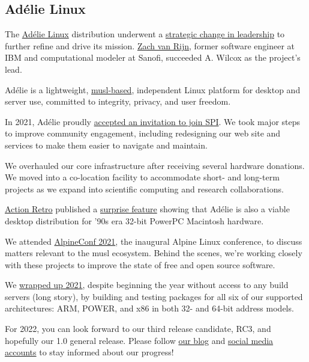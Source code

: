 \documentclass[a4paper]{report}
\begin{document}
\subsection{Adélie Linux}

The \href{https://www.adelielinux.org/}{Adélie Linux} distribution underwent a \href{https://blog.adelielinux.org/2021/07/22/2021-state-of-the-adelie-linux-distribution/}{strategic change in leadership} to further refine and drive its mission.  \href{https://zv.io/about/}{Zach van Rijn}, former software engineer at IBM and computational modeler at Sanofi, succeeded A. Wilcox as the project's lead.

Adélie is a lightweight, \href{https://musl.libc.org/}{{musl-based}}, independent Linux platform for desktop and server use, committed to integrity, privacy, and user freedom.

In 2021, Adélie proudly \href{https://www.spi-inc.org/projects/adelielinux/}{accepted an invitation to join SPI}. We took major steps to improve community engagement, including redesigning our web site and services to make them easier to navigate and maintain.

We overhauled our core infrastructure after receiving several hardware donations. We moved into a co-location facility to accommodate short- and long-term projects as we expand into scientific computing and research collaborations.

\href{https://actionretro.com/}{Action Retro} published a \href{https://www.youtube.com/watch?v=AArGaJGFVH4}{surprise feature} showing that Adélie is also a viable desktop distribution for '90s era 32-bit PowerPC Macintosh hardware.

We attended \href{https://alpinelinux.org/conf/}{{AlpineConf 2021}}, the inaugural Alpine Linux conference, to discuss matters relevant to the musl ecosystem. Behind the scenes, we're working closely with these projects to improve the state of free and open source software.

We \href{https://blog.adelielinux.org/2021/12/31/new-year-new-builders/}{wrapped up 2021}, despite beginning the year without access to any build servers (long story), by building and testing packages for all six of our supported architectures: ARM, POWER, and x86 in both 32- and 64-bit address models.

For 2022, you can look forward to our third release candidate, RC3, and hopefully our 1.0 general release. Please follow \href{https://blog.adelielinux.org/}{our blog} and \href{https://www.adelielinux.org/contact/}{social media accounts} to stay informed about our progress!
\end{document}
